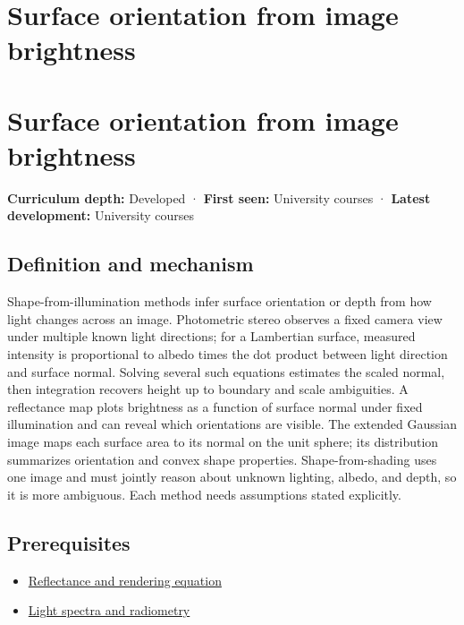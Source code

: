 \hypertarget{appendix-89b2d5b7c9e1}{}
\section*{Surface orientation from image brightness}
\section{Surface orientation from image brightness}\label{surface-orientation-from-image-brightness}

\textbf{Curriculum depth:} Developed · \textbf{First seen:} University courses · \textbf{Latest development:} University courses

\subsection{Definition and mechanism}\label{definition-and-mechanism}

Shape-from-illumination methods infer surface orientation or depth from how light changes across an image. Photometric stereo observes a fixed camera view under multiple known light directions; for a Lambertian surface, measured intensity is proportional to albedo times the dot product between light direction and surface normal. Solving several such equations estimates the scaled normal, then integration recovers height up to boundary and scale ambiguities. A reflectance map plots brightness as a function of surface normal under fixed illumination and can reveal which orientations are visible. The extended Gaussian image maps each surface area to its normal on the unit sphere; its distribution summarizes orientation and convex shape properties. Shape-from-shading uses one image and must jointly reason about unknown lighting, albedo, and depth, so it is more ambiguous. Each method needs assumptions stated explicitly.

\subsection{Prerequisites}\label{prerequisites}

\begin{itemize}
\tightlist
\item
  \hyperref[appendix-96da0b153b77]{Reflectance and rendering equation}
\item
  \hyperref[appendix-215c2570199b]{Light spectra and radiometry}
\end{itemize}

